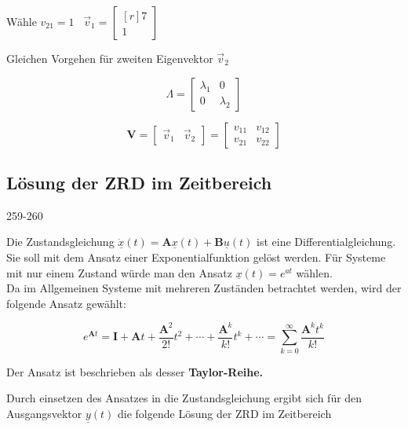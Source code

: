 \begin{minipage}[c]{0.4\columnwidth}
    Wähle $v_{21} = 1$ \quad \textrightarrow\ $ \vec{v}_1 = \begin{bmatrix*}[r] 7 \\ 1 \end{bmatrix*} $
\end{minipage}
\hfill
\begin{minipage}[c]{0.56\columnwidth}
   Gleichen Vorgehen für zweiten Eigenvektor $\vec{v}_2$
\end{minipage}

\begin{minipage}[c]{0.48\columnwidth}
    $$ \Lambda = \begin{bmatrix} \lambda_1 & 0 \\ 0 & \lambda_2 \end{bmatrix} $$
\end{minipage}
\hfill
\begin{minipage}[c]{0.48\columnwidth}
    $$ \bm{V} = \begin{bmatrix} \vec{v}_1 & \vec{v}_2 \end{bmatrix} = \begin{bmatrix} v_{11} & v_{12} \\ v_{21} & v_{22} \end{bmatrix} $$
\end{minipage}


\subsection{Lösung der ZRD im Zeitbereich}{259-260}
\label{ZRD Lösung Zeitbereich}

Die Zustandsgleichung $\underline{\dot{x}}(t) = \bm{A} \underline{x}(t) + \bm{B} \underline{u}(t)$ ist eine Differentialgleichung.
Sie soll mit dem Ansatz einer Exponentialfunktion gelöst werden. Für Systeme mit nur einem Zustand würde man den Ansatz 
$\underline{x}(t) = e^{at}$ wählen. \\
Da im Allgemeinen Systeme mit mehreren Zuständen betrachtet werden, wird der folgende Ansatz gewählt:

$$ e^{\bm{A} t} = \bm{I} + \bm{A} t + \frac{\bm{A}^2}{2!} t^2 + \cdots + \frac{\bm{A}^k}{k!} t^k + \cdots 
    = \sum\limits_{k=0}^{\infty} \frac{\bm{A}^k t^k}{k!} $$

Der Ansatz ist beschrieben als desser \textbf{Taylor-Reihe.}

Durch einsetzen des Ansatzes in die Zustandsgleichung ergibt sich für den Ausgangsvektor $\underline{y}(t)$ die folgende Lösung
der ZRD im Zeitbereich

